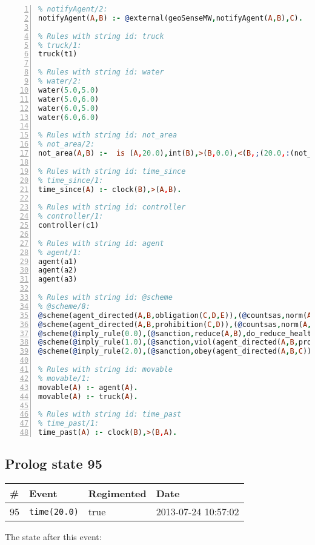 \documentclass[11pt]{article}\usepackage[utf8]{inputenc}\usepackage{geometry}
\begin{document}
\begin{lstlisting}[language=Prolog, numbers=left]
% Rules with string id: notifyAgent
% notifyAgent/2:
notifyAgent(A,B) :- @external(geoSenseMW,notifyAgent(A,B),C).

% Rules with string id: truck
% truck/1:
truck(t1)

% Rules with string id: water
% water/2:
water(5.0,5.0)
water(5.0,6.0)
water(6.0,5.0)
water(6.0,6.0)

% Rules with string id: not_area
% not_area/2:
not_area(A,B) :-  is (A,20.0),int(B),>(B,0.0),<(B,;(20.0,:(not_area(A,B), is (-(B),20.0)))),int(A),>(A,0.0),<(A,;(20.0,:(area(A,B),-(int(A))))),int(B),>(A,0.0),>(B,0.0),<(A,21.0),<(B,21.0).

% Rules with string id: time_since
% time_since/1:
time_since(A) :- clock(B),>(A,B).

% Rules with string id: controller
% controller/1:
controller(c1)

% Rules with string id: agent
% agent/1:
agent(a1)
agent(a2)
agent(a3)

% Rules with string id: @scheme
% @scheme/8:
@scheme(agent_directed(A,B,obligation(C,D,E)),(@countsas,norm(A,B,F,obligation(C,D,E)),F),false,(listTrue(C)),(time_past(D)),false,[plus(viol(agent_directed(A,B,obligation(C,D,E))))|[]],[plus(obey(agent_directed(A,B,obligation(C,D,E))))|[]])
@scheme(agent_directed(A,B,prohibition(C,D)),(@countsas,norm(A,B,E,prohibition(C,D)),E),(listTrue(C)),false,(false),false,[plus(viol(agent_directed(A,B,prohibition(C,D))))|[]],[plus(obey(agent_directed(A,B,prohibition(C,D))))|[]])
@scheme(@imply_rule(0.0),(@sanction,reduce(A,B),do_reduce_health(A,B),notifyAgent(A,changed(status))),true,false,false,false,[min(reduce(A,B))|[]],[])
@scheme(@imply_rule(1.0),(@sanction,viol(agent_directed(A,B,prohibition(C,D))),do_sanction(D)),true,false,false,false,[min(viol(agent_directed(A,B,prohibition(C,D))))|[]],[])
@scheme(@imply_rule(2.0),(@sanction,obey(agent_directed(A,B,C))),true,false,false,false,[min(obey(agent_directed(A,B,C)))|[]],[])

% Rules with string id: movable
% movable/1:
movable(A) :- agent(A).
movable(A) :- truck(A).

% Rules with string id: time_past
% time_past/1:
time_past(A) :- clock(B),>(B,A).

\end{lstlisting}
\clearpage 
\subsection{Prolog state 95}
\begin{table}[ht]
\centering 
\begin{tabular}{l l l l} 
\textbf{\#} & \textbf{Event} & \textbf{Regimented} & \textbf{Date} \\ [0.5ex] 
\hline
95&\texttt{time(20.0)}&true&2013-07-24 10:57:02\\ [1ex] \hline\end{tabular}
\end{table}
The state after this event:
\end{document}
